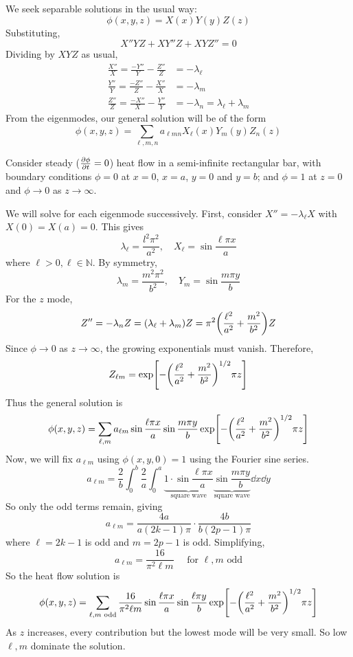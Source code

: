 \documentclass[a4paper]{article}
\begin{document}
We seek separable solutions in the usual way:
\[
	\phi(x,y,z) = X(x)Y(y)Z(z)
\]
Substituting,
\[
	X''YZ + XY''Z + XYZ'' = 0
\]
Dividing by \( XYZ \) as usual,
\begin{align*}
	\frac{X''}{X} = \frac{-Y''}{Y} - \frac{Z''}{Z} & = -\lambda_\ell                         \\
	\frac{Y''}{Y} = \frac{-Z''}{Z} - \frac{X''}{X} & = -\lambda_m                            \\
	\frac{Z''}{Z} = \frac{-X''}{X} - \frac{Y''}{Y} & = -\lambda_n = \lambda_\ell + \lambda_m
\end{align*}
From the eigenmodes, our general solution will be of the form
\[
	\phi(x,y,z) = \sum_{\ell,m,n} a_{\ell mn} X_\ell(x) Y_m(y) Z_n(z)
\]

\begin{example}
    Consider steady (\(\pdv{\phi}{t} = 0 \)) heat flow in a semi-infinite rectangular bar, with boundary conditions \( \phi = 0 \) at \( x = 0 \), \( x = a \), \( y = 0 \) and \( y = b \); and \( \phi = 1 \) at \( z = 0 \) and \( \phi \to 0 \) as \( z \to \infty \).
\end{example}

We will solve for each eigenmode successively.
First, consider \( X'' = -\lambda_\ell X \) with \( X(0) = X(a) = 0 \).
This gives
\[
	\lambda_\ell = \frac{l^2 \pi^2}{a^2}, \quad X_\ell = \sin \frac{\ell \pi x}{a}
\]
where \( \ell > 0, \ell \in \mathbb N \).
By symmetry,
\[
	\lambda_m = \frac{m^2 \pi^2}{b^2}, \quad Y_m = \sin \frac{m \pi y}{b}
\]
For the \( z \) mode,
\[
	Z'' = -\lambda_n Z = (\lambda_\ell + \lambda_m) Z = \pi^2\qty(\frac{\ell^2}{a^2} + \frac{m^2}{b^2}) Z
\]
Since \( \phi \to 0 \) as \( z \to \infty \), the growing exponentials must vanish.
Therefore,
\[
	Z_{\ell m} = \exp[-\qty(\frac{\ell^2}{a^2} + \frac{m^2}{b^2})^{1/2} \pi z]
\]
Thus the general solution is
\[
	\phi(x,y,z) = \sum_{\ell, m} a_{\ell m} \sin \frac{\ell \pi x}{a} \sin \frac{m \pi y}{b} \exp[-\qty(\frac{\ell^2}{a^2} + \frac{m^2}{b^2})^{1/2} \pi z]
\]
Now, we will fix \( a_{\ell m} \) using \( \phi(x,y,0) = 1 \) using the Fourier sine series.
\[
	a_{\ell m} = \frac{2}{b} \int_0^b \frac{2}{a} \int_0^a \underbrace{1\cdot \sin \frac{\ell \pi x}{a}}_{\text{square wave}} \underbrace{\sin \frac{m \pi y}{b}}_{\text{square wave}} \dd{x} \dd{y}
\]
So only the odd terms remain, giving
\[
	a_{\ell m} = \frac{4a}{a(2k-1)\pi} \cdot \frac{4b}{b(2p-1) \pi}
\]
where \( \ell = 2k-1 \) is odd and \( m = 2p-1 \) is odd.
Simplifying,
\[
	a_{\ell m} = \frac{16}{\pi^2 \ell m} \quad \text{ for } \ell, m \text{ odd}
\]
So the heat flow solution is
\[
	\phi(x,y,z) = \sum_{\ell, m \text{ odd}} \frac{16}{\pi^2 \ell m} \sin \frac{\ell \pi x}{a} \sin \frac{\ell \pi y}{b} \exp[-\qty(\frac{\ell^2}{a^2} + \frac{m^2}{b^2})^{1/2} \pi z]
\]
As \( z \) increases, every contribution but the lowest mode will be very small.
So low \( \ell, m \) dominate the solution.
\end{document}
